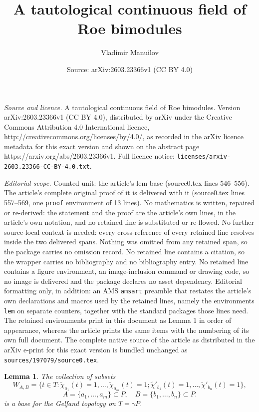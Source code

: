 \documentclass[10pt,a4paper]{amsart}
\title{A tautological continuous field of Roe bimodules}
\author{Vladimir Manuilov}
\date{Source: arXiv:2603.23366v1 (CC BY 4.0)}
\newtheorem{lem}{Lemma}
\newcommand{\til}{\widetilde}
\begin{document}
\maketitle

\noindent\emph{Source and licence.} A tautological continuous field of Roe bimodules. Version arXiv:2603.23366v1 (CC BY 4.0), distributed by arXiv under the Creative Commons Attribution 4.0 International licence, http://creativecommons.org/licenses/by/4.0/, as recorded in the arXiv licence metadata for this exact version and shown on the abstract page https://arxiv.org/abs/2603.23366v1. Full licence notice: \texttt{licenses/arxiv-2603.23366-CC-BY-4.0.txt}.\par\smallskip

\noindent\textit{Editorial scope.} Counted unit: the article's lem base (source0.tex lines 546--556). The article's complete original proof of it is delivered with it (source0.tex lines 557--569, one \texttt{proof} environment of 13 lines). No mathematics is written, repaired or re-derived: the statement and the proof are the article's own lines, in the article's own notation, and no retained line is substituted or re-flowed.  No further source-local context is needed: every cross-reference of every retained line resolves inside the two delivered spans.  Nothing was omitted from any retained span, so the package carries no omission record.  No retained line contains a citation, so the wrapper carries no bibliography and no bibliography entry.  No retained line contains a figure environment, an image-inclusion command or drawing code, so no image is delivered and the package declares no asset dependency.  Editorial formatting only, in addition: an AMS \texttt{amsart} preamble that restates the article's own declarations and macros used by the retained lines, namely the environments \texttt{lem} on separate counters, together with the standard packages those lines need.  The retained environments print in this document as Lemma 1 in order of appearance, whereas the article prints the same items with the numbering of its own full document.  The complete native source of the article as distributed in the arXiv e-print for this exact version is bundled unchanged as \texttt{sources/197079/source0.tex}.
\begin{lem}
The collection of subsets 
\begin{equation}\label{base}
W_{A,B}=\{t\in T:\til\chi_{a_1}(t)=1,\ldots,\til\chi_{a_m}(t)=1;\til\chi'_{b_1}(t)=1,\ldots,\til\chi'_{b_n}(t)=1\},
\end{equation}
$$
A=\{a_1,\ldots,a_m\}\subset P,\quad B=\{b_1,\ldots,b_n\}\subset P.
$$ 
is a base for the Gelfand topology on $T=\gamma P$.  

\end{lem}
\end{document}
